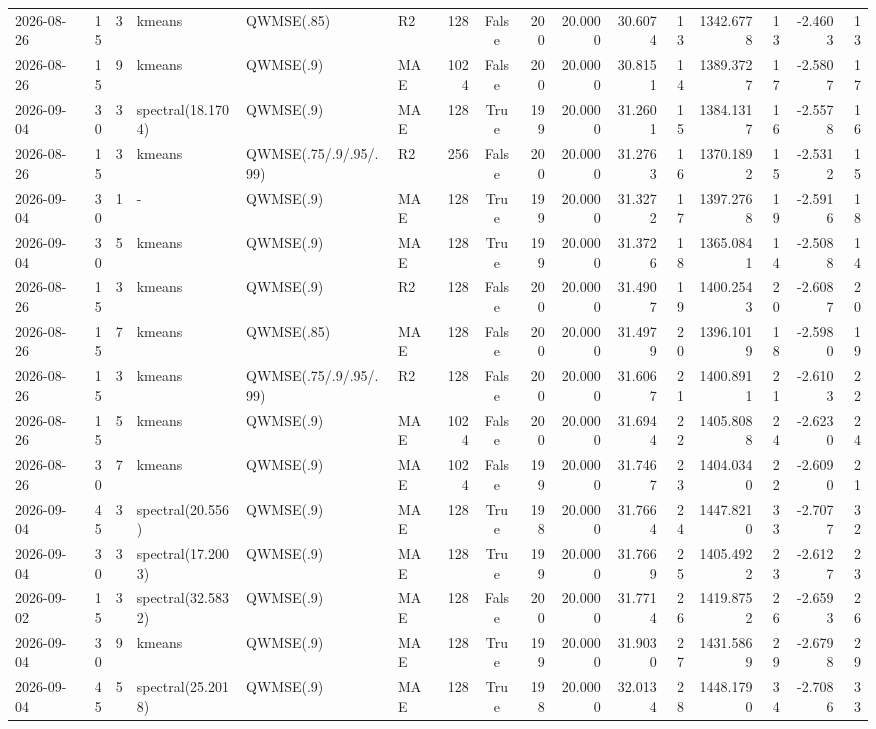 \documentclass[10pt]{article}
\begin{document}
\begin{landscape}
\begin{longtable}{@{}lrrlllrcrrrrrrrr@{}}
2026-08-26 & 15 & 3 & kmeans & QWMSE(.85) & R2 & 128 & False & 200 & 20.0000 & 30.6074 & 13 & 1342.6778 & 13 & -2.4603 & 13 \\
2026-08-26 & 15 & 9 & kmeans & QWMSE(.9) & MAE & 1024 & False & 200 & 20.0000 & 30.8151 & 14 & 1389.3727 & 17 & -2.5807 & 17 \\
2026-09-04 & 30 & 3 & spectral(18.1704) & QWMSE(.9) & MAE & 128 & True & 199 & 20.0000 & 31.2601 & 15 & 1384.1317 & 16 & -2.5578 & 16 \\
2026-08-26 & 15 & 3 & kmeans & QWMSE(.75/.9/.95/.99) & R2 & 256 & False & 200 & 20.0000 & 31.2763 & 16 & 1370.1892 & 15 & -2.5312 & 15 \\
2026-09-04 & 30 & 1 & - & QWMSE(.9) & MAE & 128 & True & 199 & 20.0000 & 31.3272 & 17 & 1397.2768 & 19 & -2.5916 & 18 \\
2026-09-04 & 30 & 5 & kmeans & QWMSE(.9) & MAE & 128 & True & 199 & 20.0000 & 31.3726 & 18 & 1365.0841 & 14 & -2.5088 & 14 \\
2026-08-26 & 15 & 3 & kmeans & QWMSE(.9) & R2 & 128 & False & 200 & 20.0000 & 31.4907 & 19 & 1400.2543 & 20 & -2.6087 & 20 \\
2026-08-26 & 15 & 7 & kmeans & QWMSE(.85) & MAE & 128 & False & 200 & 20.0000 & 31.4979 & 20 & 1396.1019 & 18 & -2.5980 & 19 \\
2026-08-26 & 15 & 3 & kmeans & QWMSE(.75/.9/.95/.99) & R2 & 128 & False & 200 & 20.0000 & 31.6067 & 21 & 1400.8911 & 21 & -2.6103 & 22 \\
2026-08-26 & 15 & 5 & kmeans & QWMSE(.9) & MAE & 1024 & False & 200 & 20.0000 & 31.6944 & 22 & 1405.8088 & 24 & -2.6230 & 24 \\
2026-08-26 & 30 & 7 & kmeans & QWMSE(.9) & MAE & 1024 & False & 199 & 20.0000 & 31.7467 & 23 & 1404.0340 & 22 & -2.6090 & 21 \\
2026-09-04 & 45 & 3 & spectral(20.556) & QWMSE(.9) & MAE & 128 & True & 198 & 20.0000 & 31.7664 & 24 & 1447.8210 & 33 & -2.7077 & 32 \\
2026-09-04 & 30 & 3 & spectral(17.2003) & QWMSE(.9) & MAE & 128 & True & 199 & 20.0000 & 31.7669 & 25 & 1405.4922 & 23 & -2.6127 & 23 \\
2026-09-02 & 15 & 3 & spectral(32.5832) & QWMSE(.9) & MAE & 128 & False & 200 & 20.0000 & 31.7714 & 26 & 1419.8752 & 26 & -2.6593 & 26 \\
2026-09-04 & 30 & 9 & kmeans & QWMSE(.9) & MAE & 128 & True & 199 & 20.0000 & 31.9030 & 27 & 1431.5869 & 29 & -2.6798 & 29 \\
2026-09-04 & 45 & 5 & spectral(25.2018) & QWMSE(.9) & MAE & 128 & True & 198 & 20.0000 & 32.0134 & 28 & 1448.1790 & 34 & -2.7086 & 33 \\

\end{longtable}
\end{landscape}
\end{document}
